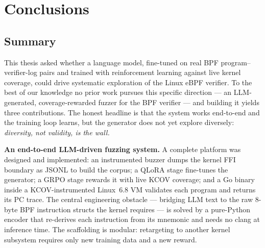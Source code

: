 \chapter{Conclusions}
\label{ch:conclusions}

\section{Summary}
\label{sec:summary}

This thesis asked whether a language model, fine-tuned on real BPF
program--verifier-log pairs and trained with reinforcement learning against live
kernel coverage, could drive systematic exploration of the Linux eBPF verifier. To
the best of our knowledge no prior work pursues this specific direction --- an
LLM-generated, coverage-rewarded fuzzer for the BPF verifier --- and building it
yields three contributions. The honest headline is that the system works
end-to-end and the training loop learns, but the generator does not yet explore
diversely: \emph{diversity, not validity, is the wall.}

\textbf{An end-to-end LLM-driven fuzzing system.}
A complete platform was designed and implemented: an instrumented buzzer dumps the
kernel FFI boundary as JSONL to build the corpus; a QLoRA stage fine-tunes the
generator; a GRPO stage rewards it with live KCOV coverage; and a Go binary inside
a KCOV-instrumented Linux~6.8 VM validates each program and returns its PC trace.
The central engineering obstacle --- bridging LLM text to the raw 8-byte BPF
instruction structs the kernel requires --- is solved by a pure-Python encoder that
re-derives each instruction from its mnemonic and needs no clang at inference time. The scaffolding is modular: retargeting to another kernel
subsystem requires only new training data and a new reward.

